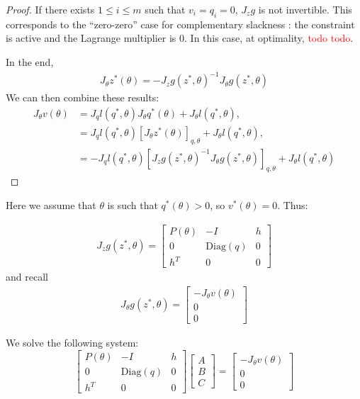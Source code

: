 \begin{proof}
If there exists $1 \leq i\leq m$ such that $v_i = q_i = 0$, $J_z g$ is not invertible. This corresponds to the ``zero-zero'' case for complementary slackness : the constraint is active and the Lagrange multiplier is $0$. In this case, at optimality, \textcolor{red}{todo todo}.


In the end,
\begin{align}
    J_\theta z^*(\theta) = - J_zg(z^*, \theta)^{-1}J_\theta g(z^*, \theta)
\end{align}
We can then combine these results:
\begin{align}
J_\theta v(\theta) &=  J_q l(q^*, \theta)J_\theta q^*(\theta) + J_\theta l(q^*, \theta),\\
&= J_q l(q^*, \theta)  \left[J_\theta z^*(\theta)\right]_{q, \theta} + J_\theta l(q^*, \theta),\\
&= - J_ql(q^*, \theta) \left[J_z g(z^*, \theta)^{-1} J_\theta g(z^*, \theta)\right]_{q,\theta}+ J_\theta l(q^*, \theta)
\end{align}
\end{proof}

Here we assume that $\theta$ is such that $q^*(\theta) > 0 $, so $v^*(\theta)=0$. Thus:

\begin{align}
    J_z g(z^*, \theta) = \begin{bmatrix}
    P(\theta) & - I & h\\
    0 & \mathrm{Diag}(q)& 0\\
    h^T & 0 & 0
    \end{bmatrix}
\end{align}
 and recall
\begin{align}
    J_\theta g(z^*, \theta) = \begin{bmatrix}
    -J_\theta v(\theta)\\
    0 \\
    0
    \end{bmatrix}
\end{align}

We solve the following system:
\begin{equation}
\begin{bmatrix}
    P(\theta) & - I & h\\
    0 & \mathrm{Diag}(q)& 0\\
    h^T & 0 & 0
    \end{bmatrix}
\begin{bmatrix}
    A \\
    B \\
    C
    \end{bmatrix} =
\begin{bmatrix}
    - J_\theta v(\theta) \\
    0 \\
    0
    \end{bmatrix}
\end{equation}

